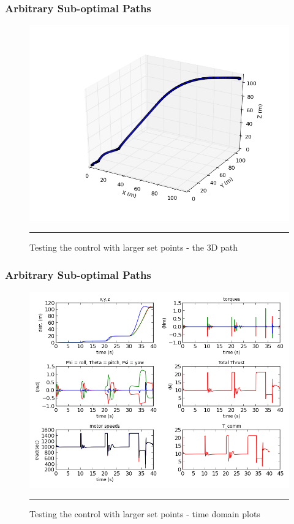 \documentclass{beamer}
\begin{document}

\begin{frame}
\frametitle{Arbitrary Sub-optimal Paths}
\begin{figure}[htbp]
	\centering
		\includegraphics[width=\textwidth]{Figures/largeSetpointDifferencesTest_3d.png}
		\rule{35em}{0.5pt}
	\caption[largeSetpointDifferencesTest3D path]{Testing the control with larger set points - the 3D path}
	\label{fig:largeSetpointDifferencesTest3D path}
\end{figure}

\end{frame}



\begin{frame}
\frametitle{Arbitrary Sub-optimal Paths}
\begin{figure}[htbp]
	\centering
		\includegraphics[width=\textwidth]{Figures/largeSetpointDifferencesTest_timedomain.png}
		\rule{35em}{0.5pt}
	\caption[largeSetpointDifferencesTesttimedomain]{Testing the control with larger set points - time domain plots }

\end{figure}

\end{frame}
\end{document}

